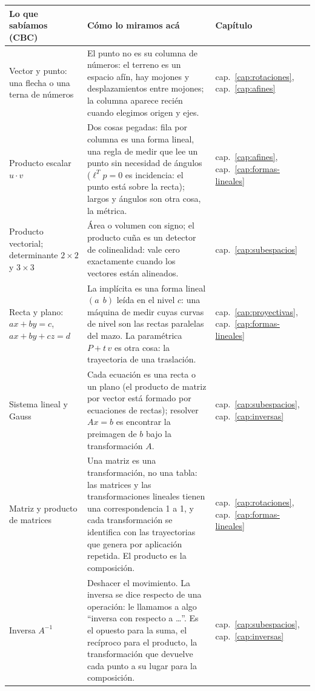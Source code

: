 {\small
\begin{tabularx}{\textwidth}{>{\raggedright\arraybackslash}p{30mm} Y >{\raggedright\arraybackslash}p{17mm}}
\toprule
\textbf{Lo que sabíamos (CBC)} & \textbf{Cómo lo miramos acá} & \textbf{Capítulo}\\
\midrule
Vector y punto: una flecha o una terna de números &
El punto no es su columna de números: el terreno es un espacio afín, hay mojones y
desplazamientos entre mojones; la columna aparece recién cuando elegimos origen y ejes. &
cap.~\ref{cap:rotaciones}, cap.~\ref{cap:afines}\\
Producto escalar \(u\cdot v\) &
Dos cosas pegadas: fila por columna es una forma lineal, una regla de medir que lee un
punto sin necesidad de ángulos (\(\ell^Tp=0\) es incidencia: el punto está sobre la
recta); largos y ángulos son otra cosa, la métrica. &
cap.~\ref{cap:afines}, cap.~\ref{cap:formas-lineales}\\
Producto vectorial; determinante \(2\times2\) y \(3\times3\) &
Área o volumen con signo; el producto cuña es un detector de colinealidad: vale cero exactamente cuando los vectores están alineados. &
cap.~\ref{cap:subespacios}\\
Recta y plano: \(ax+by=c\), \(ax+by+cz=d\) &
La implícita es una forma lineal \((a\ \ b)\) leída en el nivel \(c\): una máquina de medir
cuyas curvas de nivel son las rectas paralelas del mazo. La paramétrica \(P+t\,v\) es otra
cosa: la trayectoria de una traslación. &
cap.~\ref{cap:proyectivas}, cap.~\ref{cap:formas-lineales}\\
Sistema lineal y Gauss &
Cada ecuación es una recta o un plano (el producto de matriz por vector está
formado por ecuaciones de rectas); resolver \(Ax=b\) es encontrar
la preimagen de \(b\) bajo la transformación \(A\). &
cap.~\ref{cap:subespacios}, cap.~\ref{cap:inversas}\\
Matriz y producto de matrices &
Una matriz es una transformación, no una tabla: las matrices y las transformaciones
lineales tienen una correspondencia 1 a 1, y cada transformación se identifica con
las trayectorias que genera por aplicación repetida. El
producto es la composición. &
cap.~\ref{cap:rotaciones}, cap.~\ref{cap:formas-lineales}\\
Inversa \(A^{-1}\) &
Deshacer el movimiento. La inversa se dice respecto de una operación: le llamamos a algo
\enquote{inversa con respecto a \ldots}. Es el opuesto para la suma, el
recíproco para el producto, la transformación que devuelve cada punto a su lugar para la
composición. &
cap.~\ref{cap:subespacios}, cap.~\ref{cap:inversas}\\

\end{tabularx}}
